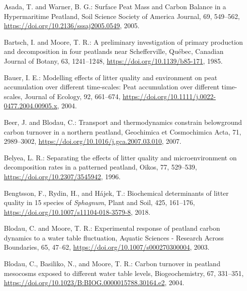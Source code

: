 \documentclass[
  12pt,
]{article}
\newlength{\cslhangindent}
\newlength{\cslentryspacingunit} %
\newenvironment{CSLReferences}[2] %
 {%
  \setlength{\parindent}{0pt}
  \ifodd #1
  \let\oldpar\par
  \def\par{\hangindent=\cslhangindent\oldpar}
  \fi
  \setlength{\parskip}{#2\cslentryspacingunit}
 }%
 {}
\begin{document}
\hypertarget{refs}{}
\begin{CSLReferences}{0}{0}
\leavevmode{}%
Asada, T. and Warner, B. G.: Surface {Peat Mass} and {Carbon Balance} in a {Hypermaritime Peatland}, Soil Science Society of America Journal, 69, 549--562, \url{https://doi.org/10.2136/sssaj2005.0549}, 2005.

\leavevmode{}%
Bartsch, I. and Moore, T. R.: A preliminary investigation of primary production and decomposition in four peatlands near {Schefferville}, {Qu{é}bec}, Canadian Journal of Botany, 63, 1241--1248, \url{https://doi.org/10.1139/b85-171}, 1985.

\leavevmode{}%
Bauer, I. E.: Modelling effects of litter quality and environment on peat accumulation over different time-scales: {Peat} accumulation over different time-scales, Journal of Ecology, 92, 661--674, \url{https://doi.org/10.1111/j.0022-0477.2004.00905.x}, 2004.

\leavevmode{}%
Beer, J. and Blodau, C.: Transport and thermodynamics constrain belowground carbon turnover in a northern peatland, Geochimica et Cosmochimica Acta, 71, 2989--3002, \url{https://doi.org/10.1016/j.gca.2007.03.010}, 2007.

\leavevmode{}%
Belyea, L. R.: Separating the effects of litter quality and microenvironment on decomposition rates in a patterned peatland, Oikos, 77, 529--539, \url{https://doi.org/10.2307/3545942}, 1996.

\leavevmode{}%
Bengtsson, F., Rydin, H., and Hájek, T.: Biochemical determinants of litter quality in 15 species of {\emph{Sphagnum}}, Plant and Soil, 425, 161--176, \url{https://doi.org/10.1007/s11104-018-3579-8}, 2018.

\leavevmode{}%
Blodau, C. and Moore, T. R.: Experimental response of peatland carbon dynamics to a water table fluctuation, Aquatic Sciences - Research Across Boundaries, 65, 47--62, \url{https://doi.org/10.1007/s000270300004}, 2003.

\leavevmode{}%
Blodau, C., Basiliko, N., and Moore, T. R.: Carbon turnover in peatland mesocosms exposed to different water table levels, Biogeochemistry, 67, 331--351, \url{https://doi.org/10.1023/B:BIOG.0000015788.30164.e2}, 2004.


\end{CSLReferences}
\end{document}
